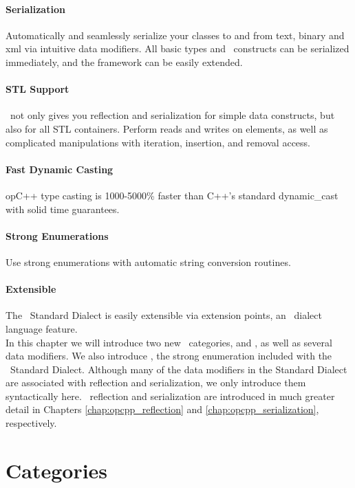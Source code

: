 \paragraph{Serialization}
Automatically and seamlessly serialize your classes to and from text, binary and xml via intuitive data modifiers.  All basic types and \opCPP\ constructs can be serialized immediately, and the framework can be easily extended.

\paragraph{STL Support}
\opCPP\ not only gives you reflection and serialization for simple data constructs, but also for all STL containers.  Perform
reads and writes on elements, as well as complicated manipulations with iteration, insertion, and removal access.

\paragraph{Fast Dynamic Casting}
opC++ type casting is 1000-5000\% faster than C++'s standard dynamic\_cast with solid time guarantees.

\paragraph{Strong Enumerations}
Use strong enumerations with automatic string conversion routines.

\paragraph{Extensible}
The \opCPP\ Standard Dialect is easily extensible via extension points, an \opCPP\ dialect language feature. \\

In this chapter we will introduce two new \opCPP\ categories,  and , as well as several data modifiers.  We also introduce , the strong enumeration included with the \opCPP\ Standard Dialect.  Although many of the data modifiers in the Standard Dialect are associated with reflection and serialization, we only introduce them syntactically here.  \opCPP\ reflection and serialization are introduced in much greater detail in Chapters \ref{chap:opcpp_reflection} and \ref{chap:opcpp_serialization}, respectively.

\section{Categories}
\label{sec:opcpp_categories}


